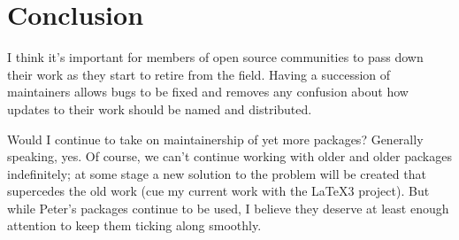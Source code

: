 \documentclass{ltugboat}
\begin{document}
\section{Conclusion}

I think it's important for members of open source communities to pass down their work as they start to retire from the field. Having a succession of maintainers allows bugs to be fixed and removes any confusion about how updates to their work should be named and distributed.

Would I continue to take on maintainership of yet more packages? Generally speaking, yes. Of course, we can't continue working with older and older packages indefinitely; at some stage a new solution to the problem will be created that supercedes the old work (cue my current work with the \LaTeX3 project). But while Peter's packages continue to be used, I believe they deserve at least enough attention to keep them ticking along smoothly.
\end{document}
